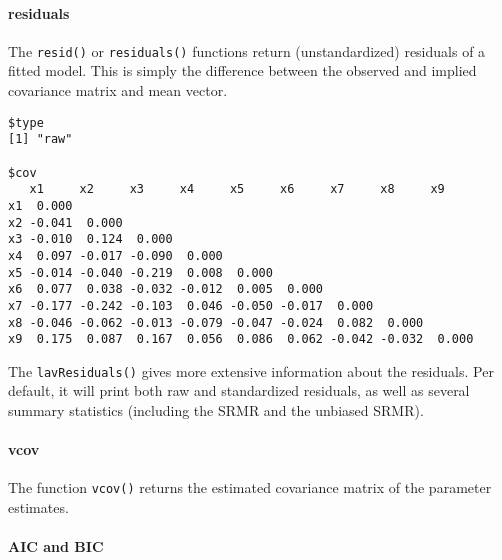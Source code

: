 \hypertarget{residuals}{%
\paragraph{residuals}\label{residuals}}

The \texttt{resid()} or \texttt{residuals()} functions return
(unstandardized) residuals of a fitted model. This is simply the
difference between the observed and implied covariance matrix and mean
vector.

\begin{Shaded}
\begin{Highlighting}[]
\OtherTok{\textless{}{-}} 
\end{Highlighting}
\end{Shaded}

\begin{verbatim}
$type
[1] "raw"

$cov
   x1     x2     x3     x4     x5     x6     x7     x8     x9    
x1  0.000                                                        
x2 -0.041  0.000                                                 
x3 -0.010  0.124  0.000                                          
x4  0.097 -0.017 -0.090  0.000                                   
x5 -0.014 -0.040 -0.219  0.008  0.000                            
x6  0.077  0.038 -0.032 -0.012  0.005  0.000                     
x7 -0.177 -0.242 -0.103  0.046 -0.050 -0.017  0.000              
x8 -0.046 -0.062 -0.013 -0.079 -0.047 -0.024  0.082  0.000       
x9  0.175  0.087  0.167  0.056  0.086  0.062 -0.042 -0.032  0.000
\end{verbatim}

The \texttt{lavResiduals()} gives more extensive information about the
residuals. Per default, it will print both raw and standardized
residuals, as well as several summary statistics (including the SRMR and
the unbiased SRMR).

\hypertarget{vcov}{%
\paragraph{vcov}\label{vcov}}

The function \texttt{vcov()} returns the estimated covariance matrix of
the parameter estimates.

\hypertarget{aic-and-bic}{%
\paragraph{AIC and BIC}\label{aic-and-bic}}

